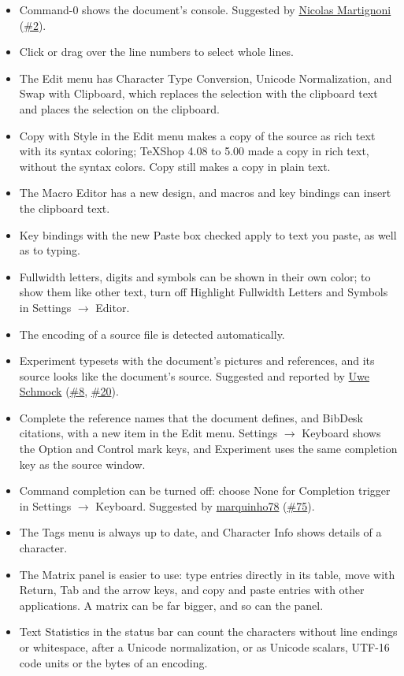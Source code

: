 \documentclass[11pt,letterpaper]{article}
\begin{document}
\begin{itemize}
\item Command-0 shows the document’s console. Suggested by \href{https://github.com/martignoni}{Nicolas Martignoni} (\href{https://github.com/TeXShopProject/TeXShop/issues/2}{\#2}).
\item Click or drag over the line numbers to select whole lines.
\item The Edit menu has Character Type Conversion, Unicode Normalization, and Swap with Clipboard, which replaces the selection with the clipboard text and places the selection on the clipboard.
\item Copy with Style in the Edit menu makes a copy of the source as rich text with its syntax coloring; TeXShop 4.08 to 5.00 made a copy in rich text, without the syntax colors. Copy still makes a copy in plain text.
\item The Macro Editor has a new design, and macros and key bindings can insert the clipboard text.
\item Key bindings with the new Paste box checked apply to text you paste, as well as to typing.
\item Fullwidth letters, digits and symbols can be shown in their own color; to show them like other text, turn off Highlight Fullwidth Letters and Symbols in Settings \(\rightarrow\) Editor.
\item The encoding of a source file is detected automatically.
\item Experiment typesets with the document’s pictures and references, and its source looks like the document’s source. Suggested and reported by \href{https://github.com/Uwe-Schmock}{Uwe Schmock} (\href{https://github.com/TeXShopProject/TeXShop/issues/8}{\#8}, \href{https://github.com/TeXShopProject/TeXShop/issues/20}{\#20}).
\item Complete the reference names that the document defines, and BibDesk citations, with a new item in the Edit menu. Settings \(\rightarrow\) Keyboard shows the Option and Control mark keys, and Experiment uses the same completion key as the source window.
\item Command completion can be turned off: choose None for Completion trigger in Settings \(\rightarrow\) Keyboard. Suggested by \href{https://github.com/marquinho78}{marquinho78} (\href{https://github.com/TeXShopProject/TeXShop/issues/75}{\#75}).
\item The Tags menu is always up to date, and Character Info shows details of a character.
\item The Matrix panel is easier to use: type entries directly in its table, move with Return, Tab and the arrow keys, and copy and paste entries with other applications. A matrix can be far bigger, and so can the panel.
\item Text Statistics in the status bar can count the characters without line endings or whitespace, after a Unicode normalization, or as Unicode scalars, UTF-16 code units or the bytes of an encoding.
\end{itemize}
\end{document}
